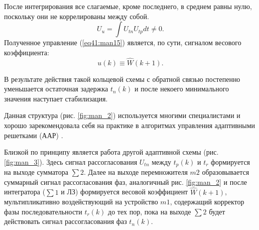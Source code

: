 После интегрирования все слагаемые, кроме последнего, в среднем равны нулю, поскольку они не коррелированы между собой.
\begin{equation}\label{eq41:man15}
U_u=\int U_{tn}U_{tp}dt\neq0.
\end{equation}
Полученное управление (\ref{eq41:man15}) является, по сути, сигналом весового коэффициента:
\begin{equation}\label{eq41:man16}
u(k)\equiv \hat W(k+1).
\end{equation}

В результате действия такой кольцевой схемы с обратной связью постепенно уменьшается остаточная задержка $t_n(k)$ и после некоего минимального значения наступает стабилизация.

Данная структура (рис. \ref{fig:man_2}) используется многими специалистами и хорошо зарекомендовала себя на практике в алгоритмах управления адаптивными решетками (ААР) \cite{popovski,monzigo,windrow}.

Близкой по принципу является работа другой адаптивной схемы (рис. \ref{fig:man_3}).
Здесь сигнал рассогласования $U_{tn}$ между $t_p(k)$ и $t_r$ формируется на выходе сумматора $\sum 2$. 
Далее на выходе перемножителя $m2$ образовывается суммарный сигнал рассогласования фаз, аналогичный рис. \ref{fig:man_2} и после интегратора ($\sum1$ и ЛЗ) формируется весовой коэффициент $\hat W(k+1)$, мультипликативно воздействующий на устройство $m1$, содержащий корректор фазы последовательности $t_r(k)$ до тех пор, пока на выходе $\sum2$ будет действовать сигнал рассогласования фаз $t_n(k)$.



